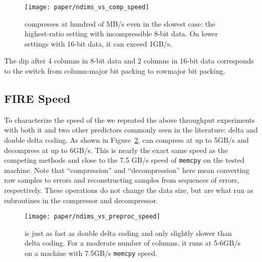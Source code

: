 \begin{figure}[h]
\begin{center}
    \texttt{[image: paper/ndims\_vs\_comp\_speed]}
    \caption{\minesp compresses at hundred of MB/s even in the slowest case: the highest-ratio setting with incompressible 8-bit data. On lower settings with 16-bit data, it can exceed 1GB/s.}
    \label{fig:ndims_vs_comp_speed}
\end{center}
\end{figure}


The dip after 4 columns in 8-bit data and 2 columns in 16-bit data corresponds to the switch from column-major bit packing to rowmajor bit packing.

\subsection{FIRE Speed}

To characterize the speed of the \fire we repeated the above throughput experiments with both it and two other predictors commonly seen in the literature: delta and double delta coding. As shown in Figure~\ref{fig:ndims_vs_preproc_speed}, \fire can compress at up to 5GB/s and decompress at up to 6GB/s. This is nearly the exact same speed as the competing methods and close to the 7.5 GB/s speed of \texttt{memcpy} on the tested machine. Note that ``compression'' and ``decompression'' here mean converting raw samples to errors and reconstructing samples from sequences of errors, respectively. These operations do not change the data size, but are what run as subroutines in the \minesp compressor and decompressor.

\begin{figure}[h]
\begin{center}
    \texttt{[image: paper/ndims\_vs\_preproc\_speed]}
    \caption{\fire is just as fast as double delta coding and only slightly slower than delta coding. For a moderate number of columns, it runs at 5-6GB/s on a machine with 7.5GB/s \texttt{memcpy} speed.}
    \label{fig:ndims_vs_preproc_speed}
\end{center}
\end{figure}

